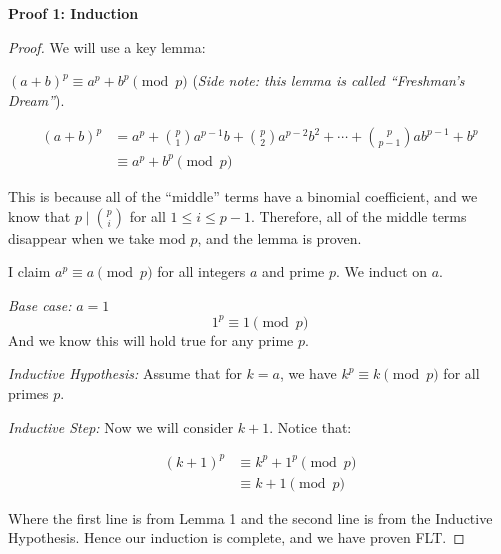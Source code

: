 \documentclass{article}
\theoremstyle{mytheoremstyle}
\theoremstyle{mytheoremstyle}
\theoremstyle{myproblemstyle}
\begin{document}
    
    \textbf{Proof 1: Induction}
    \begin{proof}
        We will use a key lemma:

        {} $(a + b)^p \equiv a^p + b^p \pmod{p}$ (\textit{Side note: this lemma is called ``Freshman's Dream''}).
        {}
        \begin{center}
            \begin{align*}
                (a + b)^p &= a^p + {{p}\choose{1}}a^{p-1}b + {{p}\choose{2}}a^{p-2}b^{2} + \cdots + {{p}\choose{p-1}}ab^{p-1} + b^{p}\\
                &\equiv a^p + b^p \pmod{p}
            \end{align*}
        \end{center}

        This is because all of the ``middle'' terms have a binomial coefficient, and we know that $p \mid {{p}\choose{i}}$ for all $1 \leq i \leq p-1$. Therefore, all of the middle terms disappear when we take mod $p$, and the lemma is proven.

        I claim $a^p \equiv a \pmod{p}$ for all integers $a$ and prime $p$. We induct on $a$.

        \textit{Base case:} $a = 1$
        \[1^p \equiv 1 \pmod{p}\]
        And we know this will hold true for any prime $p$.

        \textit{Inductive Hypothesis:} Assume that for $k = a$, we have $k^p \equiv k \pmod{p}$ for all primes $p$.

        \textit{Inductive Step:} Now we will consider $k+1$. Notice that:
        \begin{center}
            \begin{align*}
                (k+1)^p &\equiv k^p + 1^p \pmod{p}\\
                &\equiv k + 1 \pmod{p}
            \end{align*}
        \end{center}

        Where the first line is from Lemma 1 and the second line is from the Inductive Hypothesis. Hence our induction is complete, and we have proven FLT.
    \end{proof}
\end{document}
